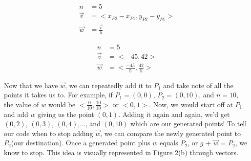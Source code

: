 \documentclass[14pt]{article}
\begin{document}
\begin{figure}[H]
	\begin{center}
		\begin{minipage}[b]{0.48\textwidth}
			\centering	
			$$
				\begin{aligned}
					n &= 5 \\
					\overrightarrow{v} &= <x_{P2} - x_{P1}, y_{P2} - y_{P1}> \\
					\overrightarrow{w} &= \frac{\overrightarrow{v}}{5}
				\end{aligned}
			$$
		\end{minipage}
		\hfill
		\begin{minipage}[b]{0.48\textwidth}
			\centering
			$$
				\begin{aligned}
					n &= 5 \\
					\overrightarrow{v} &= <-45, 42> \\
					\overrightarrow{w} &= <\frac{-45}{5}, \frac{42}{5}>
				\end{aligned}
			$$
		\end{minipage}
	\end{center}
\end{figure}

\vspace{-2mm}

Now that we have $\overrightarrow{w}$, we can repeatedly add it to $P_1$ and take note of all the points it takes us to. For example, if $P_1 = (0, 0)$, $P_2 = (0, 10)$, and $n = 10$, the value of $w$ would be $<\frac{0}{10}, \frac{10}{10}>$ or $<0, 1>$. Now, we would start off at $P_1$ and add $w$ giving us the point $(0, 1)$. Adding it again and again, we'd get $(0, 2)$, $(0, 3)$, $(0, 4)$,..., and $(0, 10)$ which are our generated points! To tell our code when to stop adding $\overrightarrow{w}$, we can compare the newly generated point to $P_2$(our destination). Once a generated point plus $w$ equals $P_2$, or $g$ + $\overrightarrow{w}$ = $P_2$, we know to stop. This idea is visually represented in Figure 2(b) through vectors. 

\vspace{1em}
\end{document}

